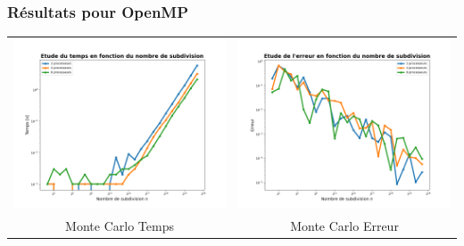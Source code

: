 \documentclass[10pt]{beamer}
\begin{document}
\begin{frame}
    \frametitle{Résultats pour OpenMP}
        \small
    \begin{tabular}{cc}
        \includegraphics[width=0.45\linewidth]{../Images/time_montecarlo_Op_MP.png} &
        \includegraphics[width=0.45\linewidth]{../Images/error_montecarlo_Op_MP.png} \\
        Monte Carlo Temps & Monte Carlo Erreur\\
    \end{tabular}
        
\end{frame}
        
    
\end{document}
